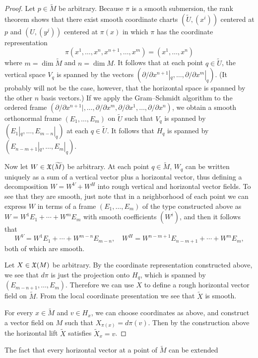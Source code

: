 \begin{proof}
Let $p\in\widetilde{M}$ be arbitrary. Because $\pi$ is a smooth submersion, the rank 
theorem shows that there exist smooth coordinate charts $(\widetilde{U},(x^i))$ 
centered at $p$ and $(U,(y^j))$ centered at $\pi(x)$ in which $\pi$ has the 
coordinate representation
\[\pi(x^1,\dots,x^n,x^{n+1},\dots,x^{m})=(x^1,\dots,x^n)\]
where $m=\dim\widetilde{M}$ and $n=\dim M$. It follows that at each point $q\in\widetilde{U}$, 
the vertical space $V_q$ is spanned by the vectors $(\partial/\partial x^{n+1}|_q,\dots,\partial/\partial x^{m}|_q)$. 
(It probably will not be the case, however, that the horizontal space is 
spanned by the other $n$ basis vectors.) If we apply the Gram–Schmidt algorithm 
to the ordered frame $(\partial/\partial x^{n+1}|,\dots,\partial/\partial x^{m},\partial/\partial x^1,\dots,\partial/\partial x^n)$, 
we obtain a smooth orthonormal frame $(E_1,\dots,E_m)$ on $\widetilde{U}$ 
such that $V_q$ is spanned by $(E_1|_q,\dots,E_{m-n}|_q)$ at each $q\in\widetilde{U}$. It follows that $H_q$ 
is spanned by $(E_{n-m+1}|_q,\dots,E_{m}|_q)$.\par
Now let $W\in\mathfrak{X}(\widetilde{M})$ be arbitrary. At each point $q\in\widetilde{M}$, $W_q$ 
can be written uniquely as a sum of a vertical vector plus a horizontal vector, 
thus defining a decomposition $W=W^V+W^H$ into rough vertical and horizontal 
vector fields. To see that they are smooth, just note that in a neighborhood 
of each point we can express $W$ in terms of a frame $(E_1,\dots,E_m)$ of the 
type constructed above as $W=W^1E_1+\cdots+W^mE_m$ with smooth coefficients $(W^i)$, 
and then it follows that
\[W^V=W^1E_1+\cdots+W^{m-n}E_{m-n},\quad W^H=W^{n-m+1}E_{n-m+1}+\cdots+W^mE_{m},\]
both of which are smooth.\par
Let $X\in\mathfrak{X}(M)$ be arbitrary. By the coordinate representation constructed above, we see that 
$d\pi$ is just the projection onto $H_q$, which is spanned by $(E_{m-n+1},\dots,E_m)$. Therefore 
we can use $X$ to define a rough horizontal vector field on $\widetilde{M}$. From the 
local coordinate presentation we see that $\widetilde{X}$ is smooth.\par
For every $x\in\widetilde{M}$ and $v\in H_x$, we can choose coordinates as above, and construct a 
vector field on $M$ such that $X_{\pi(x)}=d\pi(v)$. Then by the construction above 
the horizontal lift $\widetilde{X}$ satisfies $\widetilde{X}_x=v$.
\end{proof}
The fact that every horizontal vector at a point of $\widetilde{M}$ can be extended 
